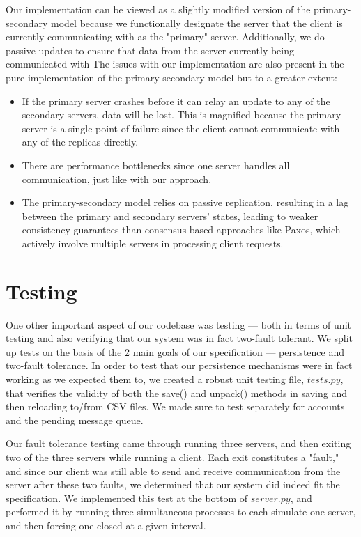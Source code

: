 \documentclass[
	a4paper, %
	10pt, %
	unnumberedsections, %
	twoside, %
]{LTJournalArticle}
\begin{document}
Our implementation can be viewed as a slightly modified version of the primary-secondary model because we functionally designate the server that the client is currently communicating with as the "primary" server. Additionally, we do passive updates to ensure that data from the server currently being communicated with  The issues with our implementation are also present in the pure implementation of the primary secondary model but to a greater extent: 
\begin{itemize}
    \item If the primary server crashes before it can relay an update to any of the secondary servers, data will be lost. This is magnified because the primary server is a single point of failure since the client cannot communicate with any of the replicas directly. 
    \item There are performance bottlenecks since one server handles all communication, just like with our approach. 
    \item The primary-secondary model relies on passive replication, resulting in a lag between the primary and secondary servers' states, leading to weaker consistency guarantees than consensus-based approaches like Paxos, which actively involve multiple servers in processing client requests.
\end{itemize}

\section{Testing}

One other important aspect of our codebase was testing --- both in terms of unit testing and also verifying that our system was in fact two-fault tolerant. We split up tests on the basis of the 2 main goals of our specification --- persistence and two-fault tolerance. In order to test that our persistence mechanisms were in fact working as we expected them to, we created a robust unit testing file, $tests.py$, that verifies the validity of both the save() and unpack() methods in saving and then reloading to/from CSV files. We made sure to test separately for accounts and the pending message queue. 

Our fault tolerance testing came through running three servers, and then exiting two of the three servers while running a client. Each exit constitutes a "fault," and since our client was still able to send and receive communication from the server after these two faults, we determined that our system did indeed fit the specification. We implemented this test at the bottom of $server.py$, and performed it by running three simultaneous processes to each simulate one server, and then forcing one closed at a given interval.
\end{document}
